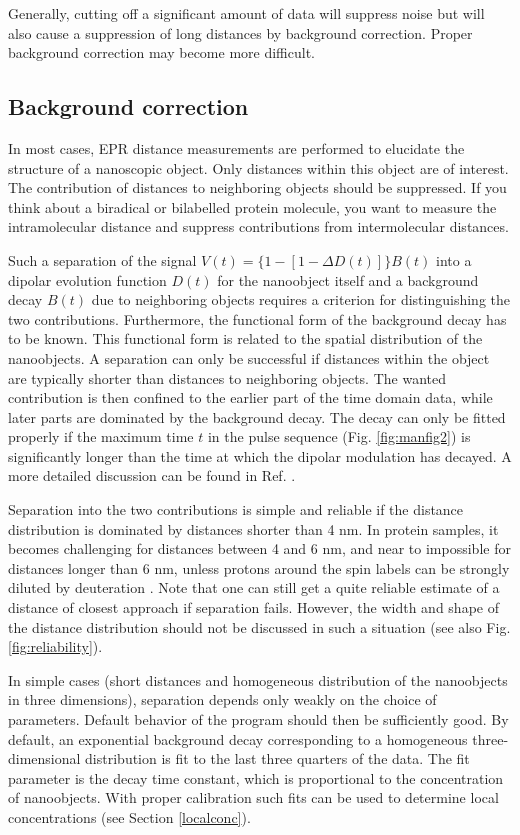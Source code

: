 \documentclass{article}
\begin{document}
Generally, cutting off a significant amount of data will suppress noise but will also cause a suppression of long distances by background correction. Proper background correction may
become more difficult. 
 
\subsection{Background correction}
In most cases, EPR distance measurements are performed to elucidate the structure
of a nanoscopic object. Only distances within this object are of interest.
The contribution of distances to neighboring objects should be suppressed. If
you think about a biradical or bilabelled protein molecule, you want to measure
the intramolecular distance and suppress contributions from intermolecular
distances.

Such a separation of the signal $V(t)= \{ 1 - [1 - \Delta D(t)] \} B(t)$ into a dipolar evolution function $D(t)$ for the
nanoobject itself and a background decay $B(t)$ due to neighboring objects requires a
criterion for distinguishing the two contributions. Furthermore, the functional
form of the background decay has to be known. This functional form is related to
the spatial distribution of the nanoobjects. A separation can only be successful
if distances within the object are typically shorter than distances to neighboring
objects. The wanted contribution is then confined to the earlier part of the time domain
data, while later parts are dominated by the background decay. The
decay can only be fitted properly if the maximum time $t$ in the pulse sequence
(Fig. \ref{fig:manfig2}) is significantly longer than the time at which the dipolar modulation
has decayed. A more detailed discussion can be found in Ref. \cite{jeschke2004a}.

Separation into the two contributions is simple and reliable if the distance
distribution is dominated by distances shorter than 4 nm. In protein samples, it
becomes challenging for distances between 4 and 6 nm, and near to impossible
for distances longer than 6 nm, unless protons around the spin labels can be
strongly diluted by deuteration \cite{jeschke2004b}. Note that one can still get a quite reliable estimate of a distance of closest approach if separation fails. However, the
width and shape of the distance distribution should not be discussed in such 
a situation (see also Fig. \ref{fig:reliability}). 

In simple cases (short distances and homogeneous distribution of the nanoobjects
in three dimensions), separation depends only weakly on the choice of parameters.
Default behavior of the program should then be sufficiently good.
By default, an exponential background decay corresponding to a homogeneous
three-dimensional distribution is fit to the last three quarters of the data. The
fit parameter is the decay time constant, which is proportional to the concentration
of nanoobjects. With proper calibration such fits can be used to determine
local concentrations (see Section \ref{localconc}).
\end{document}
